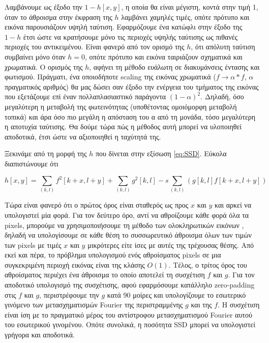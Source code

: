 \documentclass[11pt,a4paper,english,greek,twoside]{../Thesis}
\begin{document}
Λαμβάνουμε ως έξοδο την $1-h[x,y]$, η οποία θα είναι μέγιστη, κοντά στην τιμή 1, όταν το άθροισμα στην έκφραση της $h$ λαμβάνει χαμηλές τιμές, οπότε πρότυπο και εικόνα παρουσιάζουν υψηλή ταύτιση. Εφαρμόζουμε ένα κατώφλι στην έξοδο της $1-h$ έτσι ώστε να κρατήσουμε μόνο τις περιοχές υψηλής ταύτισης ως πιθανές περιοχές του αντικειμένου. Είναι φανερό από τον ορισμό της $h$, ότι απόλυτη ταύτιση συμβαίνει μόνο όταν $h=0$, οπότε πρότυπο και εικόνα ταιριάζουν σχηματικά και χρωματικά. Ο ορισμός της $h$, αφήνει τη μέθοδο ευάλωτη σε διακυμάνσεις έντασης και φωτισμού. Πράγματι, ένα οποιοδήποτε scaling της εικόνας χρωματικά ($f \to \alpha*f$, $\alpha$ πραγματικός αριθμός) θα μας δώσει σαν έξοδο την ενέργεια του τμήματος της εικόνας που εξετάζουμε επί έναν πολλαπλασιαστικό παράγοντα $(1-\alpha)^{2}$. Δηλαδή, όσο μεγαλύτερη η μεταβολή της φωτεινότητας (υποθέτοντας ομοιόμορφη μεταβολή τοπικά) και άρα όσο πιο μεγάλη η απόσταση του α από τη μονάδα, τόσο μεγαλύτερη η αποτυχία ταύτισης. Θα δούμε τώρα πώς η μέθοδος αυτή μπορεί να υλοποιηθεί αποδοτικά, έτσι ώστε να αξιοποιηθεί η ταχύτητά της.

\par Ξεκινάμε από τη μορφή της $h$ που δίνεται στην εξίσωση \eqref{eq:SSD}. Εύκολα διαπιστώνουμε ότι

\begin{equation}\label{eq:SSD2}
    h[x,y]=\sum_{(k,l)} f^{2}[k+x,l+y] + \sum_{(k,l)} g^{2}[k,l] -s\sum_{(k,l)} (g[k,l]f[k+x,l+y])
\end{equation}

Τώρα είναι φανερό ότι ο πρώτος όρος είναι σταθερός ως προς $x$ και $y$ και αρκεί να υπολογιστεί μία φορά. Για τον δεύτερο όρο, αντί να αθροίζουμε κάθε φορά όλα τα pixels, μπορούμε να χρησιμοποιήσουμε τη μέθοδο των ολοκληρωτικών εικόνων \cite{viola_2001}, δηλαδή να υπολογίσουμε σε κάθε θέση το συσσωρευτικό άθροισμα όλων των τιμών των pixels με τιμές $x$ και $y$ μικρότερες είτε ίσες με αυτές της τρέχουσας θέσης. Από εκεί και πέρα, το πρόβλημα υπολογισμού ενός αθροίσματος pixels σε μια συγκεκριμένη περιοχή εικόνας είναι της κλάσης $O(1)$. Τέλος, ο τρίτος όρος του αθροίσματος περιέχει ένα άθροισμα το οποίο αποτελεί τη συσχέτιση $f$ και $g$. Για τον αποδοτικό υπολογισμό της συσχέτισης, αφού εφαρμόσουμε κατάλληλο zero-padding στις $f$ και $g$, περιστρέφουμε την $g$ κατά 90 μοίρες και υπολογίζουμε το εσωτερικό γινόμενο των μετασχηματισμών Fourier της περιστραμμένης $g$ και της $f$. Η συσχέτιση είναι ίση με το πραγματικό μέρος του αντίστροφου μετασχηματισμού Fourier αυτού του εσωτερικού γινομένου. Οπότε συνολικά, η ποσότητα SSD μπορεί να υπολογιστεί γρήγορα και αποδοτικά.
\end{document}
